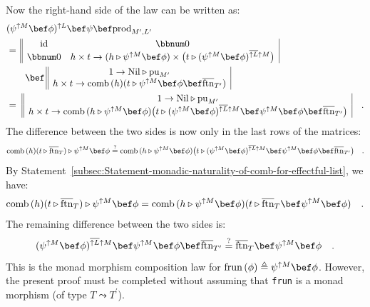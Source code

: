 Now the right-hand side of the law can be written as:
\begin{align*}
 & (\psi^{\uparrow M}\bef\phi)^{\uparrow L}\bef\psi\bef\text{prod}_{M^{\prime},L^{\prime}}\\
 & =\,\begin{array}{||cc|}
\text{id} & \bbnum 0\\
\bbnum 0 & h\times t\rightarrow(h\triangleright\psi^{\uparrow M}\bef\phi)\times\big(t\triangleright(\psi^{\uparrow M}\bef\phi)^{\overline{\uparrow L}\uparrow M}\big)
\end{array}\\
 & \quad\quad\bef\,\begin{array}{||c|}
1\rightarrow\text{Nil}\triangleright\text{pu}_{M^{\prime}}\\
h\times t\rightarrow\text{comb}\,(h)(t\triangleright\psi^{\uparrow M}\bef\phi\bef\overline{\text{ftn}}_{T^{\prime}})
\end{array}\\
 & =\,\,\begin{array}{||c|}
1\rightarrow\text{Nil}\triangleright\text{pu}_{M^{\prime}}\\
h\times t\rightarrow\text{comb}\,(h\triangleright\psi^{\uparrow M}\bef\phi)\big(t\triangleright(\psi^{\uparrow M}\bef\phi)^{\overline{\uparrow L}\uparrow M}\bef\psi^{\uparrow M}\bef\phi\bef\overline{\text{ftn}}_{T^{\prime}}\big)
\end{array}\quad.
\end{align*}
The difference between the two sides is now only in the last rows
of the matrices:
\[
\text{comb}\,(h)(t\triangleright\overline{\text{ftn}}_{T})\triangleright\psi^{\uparrow M}\bef\phi\overset{?}{=}\text{comb}\,(h\triangleright\psi^{\uparrow M}\bef\phi)\big(t\triangleright(\psi^{\uparrow M}\bef\phi)^{\overline{\uparrow L}\uparrow M}\bef\psi^{\uparrow M}\bef\phi\bef\overline{\text{ftn}}_{T^{\prime}}\big)\quad.
\]
By Statement~\ref{subsec:Statement-monadic-naturality-of-comb-for-effectful-list},
we have:
\[
\text{comb}\,(h)(t\triangleright\overline{\text{ftn}}_{T})\triangleright\psi^{\uparrow M}\bef\phi=\text{comb}\,(h\triangleright\psi^{\uparrow M}\bef\phi)(t\triangleright\overline{\text{ftn}}_{T}\bef\psi^{\uparrow M}\bef\phi)\quad.
\]
The remaining difference between the two sides is:
\[
(\psi^{\uparrow M}\bef\phi)^{\overline{\uparrow L}\uparrow M}\bef\psi^{\uparrow M}\bef\phi\bef\overline{\text{ftn}}_{T^{\prime}}\overset{?}{=}\overline{\text{ftn}}_{T}\bef\psi^{\uparrow M}\bef\phi\quad.
\]
This is the monad morphism composition law for $\text{frun}\,(\phi)\triangleq\psi^{\uparrow M}\bef\phi$.
However, the present proof must be completed without assuming that
\lstinline!frun! is a monad morphism (of type $T\leadsto T^{\prime}$).

